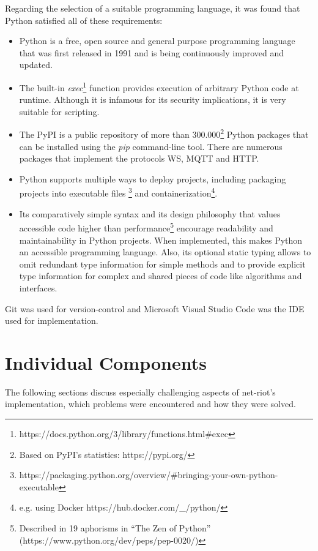 Regarding the selection of a suitable programming language, it was found that Python satisfied all of these requirements:
\begin{itemize}
    \item Python is a free, open source and general purpose programming language that was first released in 1991 and is being continuously improved and updated. %
    \item The built-in \emph{exec}\footnote{https://docs.python.org/3/library/functions.html\#exec} function provides execution of arbitrary Python code at runtime. Although it is infamous for its security implications, it is very suitable for scripting.
    \item The \ac{PyPI} is a public repository of more than 300.000\footnote{Based on \ac{PyPI}'s statistics: https://pypi.org/} Python packages that can be installed using the \emph{pip} command-line tool. There are numerous packages that implement the protocols \ac{WS}, \ac{MQTT} and \ac{HTTP}.
    \item Python supports multiple ways to deploy projects, including packaging projects into executable files \footnote{https://packaging.python.org/overview/\#bringing-your-own-python-executable} and containerization\footnote{e.g. using Docker https://hub.docker.com/\_/python/}.
    \item Its comparatively simple syntax and its design philosophy that values accessible code higher than performance\footnote{Described in 19 aphorisms in \enquote{The Zen of Python} (https://www.python.org/dev/peps/pep-0020/)} encourage readability and maintainability in Python projects. When implemented, this makes Python an accessible programming language. Also, its optional static typing allows to omit redundant type information for simple methods and to provide explicit type information for complex and shared pieces of code like algorithms and interfaces.
\end{itemize} %
Git was used for version-control and Microsoft Visual Studio Code was the \ac{IDE} used for implementation.


\section{Individual Components}
\label{sec:individual-components}
The following sections discuss especially challenging aspects of net-riot's implementation, which problems were encountered and how they were solved.

